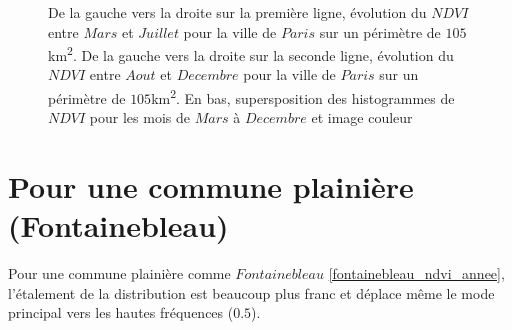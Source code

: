 \documentclass{book}
\begin{document}
\begin{figure}[H]
\begin{center}
\end{center}
\caption{De la gauche vers la droite sur la première ligne, évolution du $NDVI$ entre $Mars$ et $Juillet$ pour la ville de $Paris$ sur un périmètre de $105$km\textsuperscript{2}.
De la gauche vers la droite sur la seconde ligne, évolution du $NDVI$ entre $Aout$ et $Decembre$ pour la ville de $Paris$ sur un périmètre de $105$km\textsuperscript{2}. 
En bas, supersposition des histogrammes de $NDVI$ pour les mois de $Mars$ à $Decembre$ et image couleur}
\label{paris_ndvi_annee}
\end{figure}

\clearpage

\section{Pour une commune plainière (Fontainebleau)}

Pour une commune plainière comme $Fontainebleau$ \ref{fontainebleau_ndvi_annee}, l'étalement de la distribution est beaucoup plus franc et déplace même
le mode principal vers les hautes fréquences ($0.5$).
 
\end{document}
